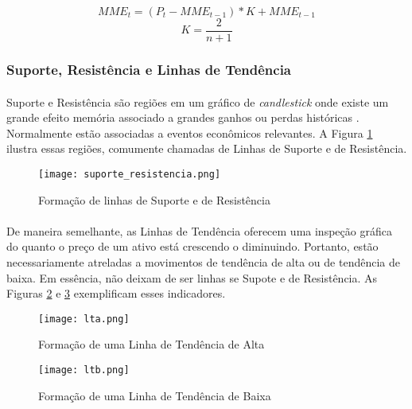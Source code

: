 \begin{equation} \label{eq:2}
    \mathit{MME_t} = (P_t - \mathit{MME_{t-1}}) * K + \mathit{MME_{t-1}}
\end{equation}
\begin{equation} \label{eq:3}
    K = \frac{2}{n+1}
\end{equation}

\subsubsection*{Suporte, Resistência e Linhas de Tendência}

\paragraph{} Suporte e Resistência são regiões em um gráfico de \textit{candlestick} onde existe um grande efeito memória associado a grandes ganhos ou perdas históricas \cite{moraes2007se}. Normalmente estão associadas a eventos econômicos relevantes. A Figura \ref{fig:3} ilustra essas regiões, comumente chamadas de Linhas de Suporte e de Resistência.

\begin{figure}[h]
    \texttt{[image: suporte\_resistencia.png]}
    \centering
    \caption{Formação de linhas de Suporte e de Resistência \cite{moraes2007se}}
    \label{fig:3}
\end{figure}

\paragraph{} De maneira semelhante, as Linhas de Tendência oferecem uma inspeção gráfica do quanto o preço de um ativo está crescendo o diminuindo. Portanto, estão necessariamente atreladas a movimentos de tendência de alta ou de tendência de baixa. Em essência, não deixam de ser linhas se Supote e de Resistência. As Figuras \ref{fig:4} e \ref{fig:5} exemplificam esses indicadores.

\begin{figure}[h]
    \texttt{[image: lta.png]}
    \centering
    \caption{Formação de uma Linha de Tendência de Alta \cite{moraes2007se}}
    \label{fig:4}
\end{figure}

\begin{figure}[h]
    \texttt{[image: ltb.png]}
    \centering
    \caption{Formação de uma Linha de Tendência de Baixa \cite{moraes2007se}}
    \label{fig:5}
\end{figure}


